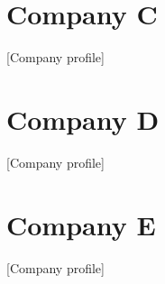 \documentclass[11pt,letterpaper]{report}
\newcommand{\baseyear}{0}
\begin{document}
\section{Company C}
[Company profile]

\section{Company D}
[Company profile]

\section{Company E}
[Company profile]

\newpage



% 
% 
%

\end{document}
